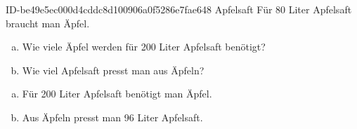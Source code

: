 \begin{exercise}
      {ID-be49e5ec000d4cddc8d100906a0f5286e7fae648}
      {Apfelsaft}
  \ifproblem\problem
    Für \num{80} Liter Apfelsaft braucht man  Äpfel.
    \begin{enumerate}[a)]
      \item Wie viele Äpfel werden für \num{200} Liter Apfelsaft benötigt?
      \item Wie viel Apfelsaft presst man aus  Äpfeln?
    \end{enumerate}
  \fi
  \ifoutcome\outcome
    \begin{enumerate}[a)]
      \item Für \num{200} Liter Apfelsaft benötigt man  Äpfel.
      \item Aus  Äpfeln presst man \num{96} Liter Apfelsaft.
    \end{enumerate}
  \fi
\end{exercise}

